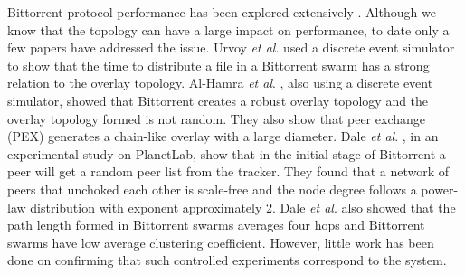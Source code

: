 Bittorrent protocol performance has been explored extensively \cite{guo2005measurements}\cite{legout2006rarest}\cite{pouwelse2004measurement}\cite{tian2007modeling}\cite{li2010measurement}\cite{zhang2010bittorrent}.  
Although we know that the topology can have a large impact on performance, to date only a few papers have addressed the issue.
Urvoy \textit{et al}. \cite{urvoy2007impact} used a discrete event simulator to show that the time to distribute a file in a Bittorrent swarm has a strong relation to the overlay topology.  
Al-Hamra \textit{et al}. \cite{al2007understanding}, also using a discrete event simulator, showed that Bittorrent creates a robust overlay topology and the overlay topology formed is not random. 
They also show that peer exchange (PEX) generates a chain-like overlay with a large diameter. 
Dale \textit{et al}. \cite{dale2008evolution}, in an experimental study on PlanetLab, show that in the initial stage of Bittorrent a peer will get a random peer list from the tracker. 
They found that a network of peers that unchoked each other is scale-free and the node degree follows a power-law distribution with exponent approximately 2. 
Dale \textit{et al}. \cite{dale2008evolution} also showed that the path length formed in Bittorrent swarms averages four hops and Bittorrent swarms have low average clustering coefficient.  
However, little work has been done on confirming that such controlled experiments correspond to the system. %

